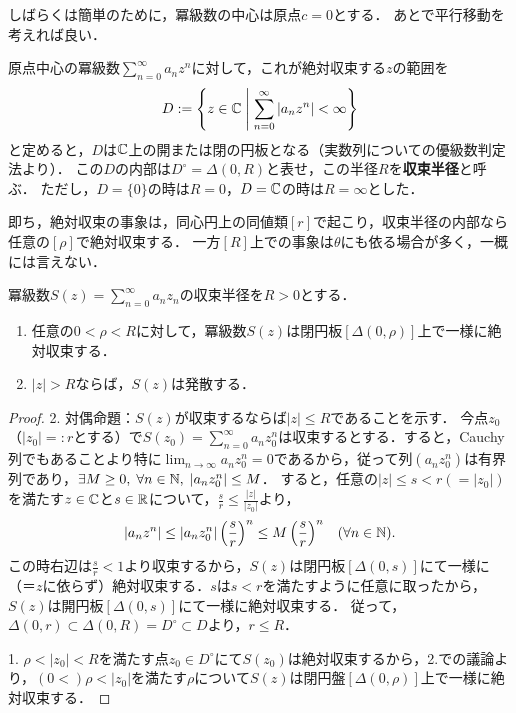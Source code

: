 \documentclass[uplatex, dvipdfmx]{jsreport}
\begin{document}
しばらくは簡単のために，冪級数の中心は原点$c=0$とする．
あとで平行移動を考えれば良い．

\begin{definition}
    原点中心の冪級数$\sum^\infty_{n=0}a_nz^n$に対して，これが絶対収束する$z$の範囲を
    \[D:=\left\{z\in\mathbb{C}\;\middle|\;\sum^\infty_{n=0}|a_nz^n|<\infty\right\}\]
    と定めると，$D$は$\mathbb{C}$上の開または閉の円板となる（実数列についての優級数判定法より）．
    この$D$の内部は$D^\circ=\Delta(0,R)$と表せ，この半径$R$を\textbf{収束半径}と呼ぶ．
    ただし，$D=\{0\}$の時は$R=0$，$D=\mathbb{C}$の時は$R=\infty$とした．
\end{definition}

即ち，絶対収束の事象は，同心円上の同値類$[r]$で起こり，収束半径の内部なら任意の$[\rho]$で絶対収束する．
一方$[R]$上での事象は$\theta$にも依る場合が多く，一概には言えない．

\begin{theorem}
    冪級数$S(z)=\sum^\infty_{n=0}a_nz_n$の収束半径を$R>0$とする．
    \begin{enumerate}
        \item 任意の$0<\rho<R$に対して，冪級数$S(z)$は閉円板$[\Delta(0,\rho)]$上で一様に絶対収束する．
        \item $|z|>R$ならば，$S(z)$は発散する．
    \end{enumerate}
\end{theorem}
\begin{proof}
    2. 対偶命題：$S(z)$が収束するならば$|z|\le R$であることを示す．
    今点$z_0$（$|z_0|=:r$とする）で$S(z_0)=\sum^\infty_{n=0}a_nz_0^n$は収束するとする．すると，Cauchy列でもあることより特に$\lim_{n\to\infty}a_nz_0^n=0$であるから，従って列$(a_nz_0^n)$は有界列であり，$\exists M\ge 0,\;\forall n\in\mathbb{N},\; |a_nz_0^n|\le M$．
    すると，任意の$|z|\le s<r(=|z_0|)$を満たす$z\in\mathbb{C}$と$s\in\mathbb{R}$について，$\frac{s}{r}\le\frac{|z|}{|z_0|}$より，
    \[ |a_nz^n|\le |a_nz_0^n|\left(\frac{s}{r}\right)^n\le M\left(\frac{s}{r}\right)^n\;\;\;(\forall n\in\mathbb{N}). \]
    この時右辺は$\frac{s}{r}<1$より収束するから，$S(z)$は閉円板$[\Delta(0,s)]$にて一様に（＝$z$に依らず）絶対収束する．$s$は$s<r$を満たすように任意に取ったから，$S(z)$は開円板$[\Delta(0,s)]$にて一様に絶対収束する．
    従って，$\Delta(0,r)\subset \Delta(0,R)=D^\circ\subset D$より，$r\le R$．

    1. $\rho<|z_0|<R$を満たす点$z_0\in D^\circ$にて$S(z_0)$は絶対収束するから，2.での議論より，$(0<)\rho<|z_0|$を満たす$\rho$について$S(z)$は閉円盤$[\Delta(0,\rho)]$上で一様に絶対収束する．
\end{proof}
\end{document}
